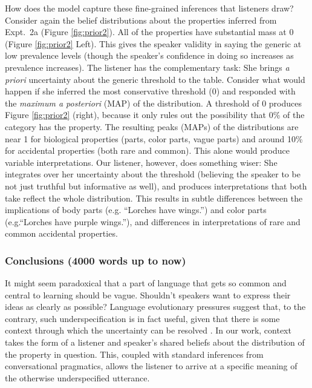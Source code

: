 \documentclass[10pt,letterpaper]{article}
\begin{document}
How does the model capture these fine-grained inferences that listeners draw?
Consider again the belief distributions about the properties inferred from Expt.~2a (Figure \ref{fig:prior2}). 
All of the properties have substantial mass at 0 (Figure \ref{fig:prior2} Left). 
This gives the speaker validity in saying the generic at low prevalence levels (though the speaker's confidence in doing so increases as prevalence increases).
The listener has the complementary task: She brings \emph{a priori} uncertainty about the generic threshold to the table.
Consider what would happen if she inferred the most conservative threshold (0) and responded with the \emph{maximum a posteriori} (MAP) of the distribution. 
A threshold of 0 produces Figure \ref{fig:prior2} (right), because it only rules out the possibility that 0\% of the category has the property. 
The resulting peaks (MAPs) of the distributions are near 1 for biological properties (parts, color parts, vague parts) and around 10\% for accidental properties (both rare and common). This alone would produce variable interpretations. 
Our listener, however, does something wiser: She integrates over her uncertainty about the threshold (believing the speaker to be not just truthful but informative as well), and produces interpretations that both take reflect the whole distribution.
This results in subtle differences between the implications of body parts (e.g. ``Lorches have wings.'') and  color parts (e.g.``Lorches have purple wings.''), and differences in interpretations of rare and common accidental properties. 


\subsubsection{Conclusions (4000 words up to now)}

It might seem paradoxical that a part of language that gets so common and central to learning should be vague. 
Shouldn't speakers want to express their ideas as clearly as possible?
Language evolutionary pressures suggest that, to the contrary, such underspecification is in fact useful, given that there is some context through which the uncertainty can be resolved \cite{Piantadosi2012}.
In our work, context takes the form of a listener and speaker's shared beliefs about the distribution of the property in question. 
This, coupled with standard inferences from conversational pragmatics, allows the listener to arrive at a specific meaning of the otherwise underspecified utterance.
\end{document}

